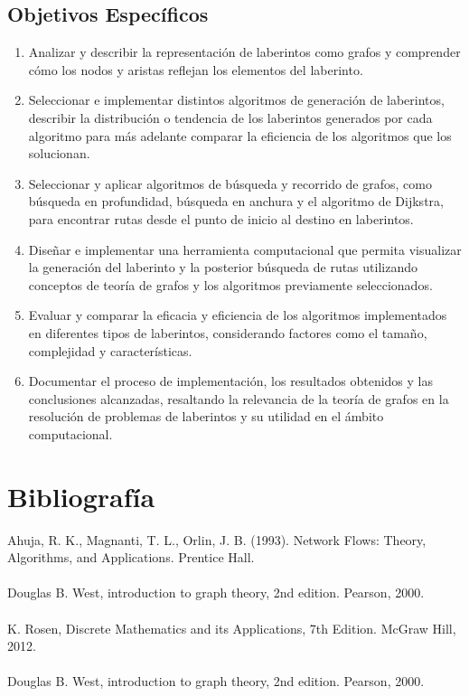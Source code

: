 \documentclass[conference]{IEEEtran}
\begin{document}
	\subsection{Objetivos Específicos}
	\vspace{0.3cm}
	\begin{enumerate}
		\item Analizar y describir la representación de laberintos como grafos y comprender cómo los nodos y aristas reflejan los elementos del laberinto.

        \item Seleccionar e implementar distintos algoritmos de generación de laberintos, describir la distribución o tendencia de los laberintos generados por cada algoritmo para más adelante comparar la eficiencia de los algoritmos que los solucionan.
		
		\item Seleccionar y aplicar algoritmos de búsqueda y recorrido de grafos, como búsqueda en profundidad, búsqueda en anchura y el algoritmo de Dijkstra, para encontrar rutas desde el punto de inicio al destino en laberintos.
		
		\item Diseñar e implementar una herramienta computacional que permita visualizar la generación del laberinto y la posterior búsqueda de rutas utilizando conceptos de teoría de grafos y los algoritmos previamente seleccionados.
		
		\item Evaluar y comparar la eficacia y eficiencia de los algoritmos implementados en diferentes tipos de laberintos, considerando factores como el tamaño, complejidad y características.
		
		\item Documentar el proceso de implementación, los resultados obtenidos y las conclusiones alcanzadas, resaltando la relevancia de la teoría de grafos en la resolución de problemas de laberintos y su utilidad en el ámbito computacional.
	\end{enumerate}
	
	
	\section{Bibliografía}
	Ahuja, R. K., Magnanti, T. L., Orlin, J. B. (1993). Network Flows: Theory, Algorithms, and Applications. Prentice Hall. \\
	\\
	Douglas B. West, introduction to graph theory, 2nd edition. Pearson, 2000.\\
	\\
	K. Rosen, Discrete Mathematics and its Applications, 7th Edition. McGraw Hill, 2012.\\
	\\
	Douglas B. West, introduction to graph theory, 2nd edition. Pearson, 2000.
	
	
	
\end{document}
